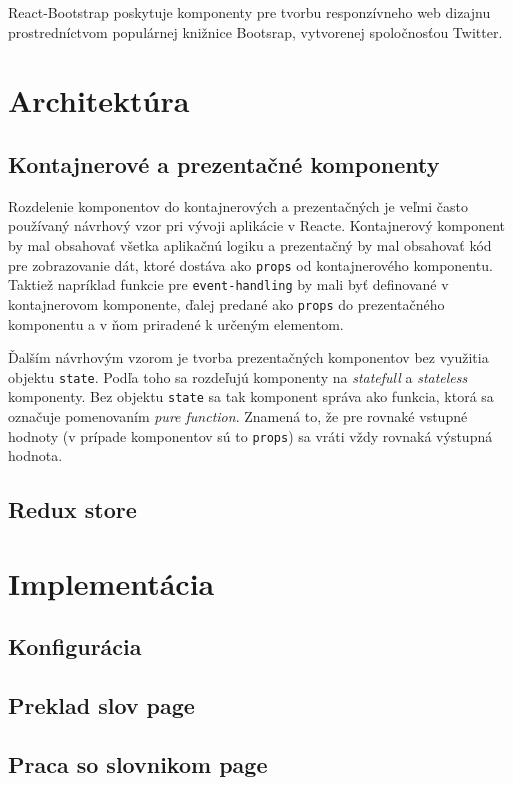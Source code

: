 \documentclass[
  digital, %
  table,   %
  lof,     %
  lot,     %
]{fithesis3}
\begin{document}
React-Bootstrap poskytuje komponenty pre tvorbu responzívneho web dizajnu prostredníctvom populárnej knižnice Bootsrap, vytvorenej spoločnosťou Twitter.

\section{Architektúra}
\subsection{Kontajnerové a prezentačné komponenty}
Rozdelenie komponentov do kontajnerových a prezentačných je veľmi často používaný návrhový vzor pri vývoji aplikácie v Reacte. Kontajnerový komponent by mal obsahovať všetka aplikačnú logiku a prezentačný by mal obsahovať kód pre zobrazovanie dát, ktoré dostáva ako \texttt{props} od kontajnerového komponentu. Taktiež napríklad funkcie pre \texttt{event-handling} by mali byť definované v kontajnerovom komponente, ďalej predané ako \texttt{props} do prezentačného komponentu a v ňom priradené k určeným elementom.

Ďalším návrhovým vzorom je tvorba prezentačných komponentov bez využitia objektu \texttt{state}. Podľa toho sa rozdeľujú komponenty na \textit{statefull} a \textit{stateless} komponenty. Bez objektu \texttt{state} sa tak komponent správa ako funkcia, ktorá sa označuje pomenovaním \textit{pure function}. Znamená to, že pre rovnaké vstupné hodnoty (v prípade komponentov sú to \texttt{props}) sa vráti vždy rovnaká výstupná hodnota.

\subsection{Redux store}

\section{Implementácia}
\subsection{Konfigurácia}
\subsection{Preklad slov page}
\subsection{Praca so slovnikom page}
\end{document}
